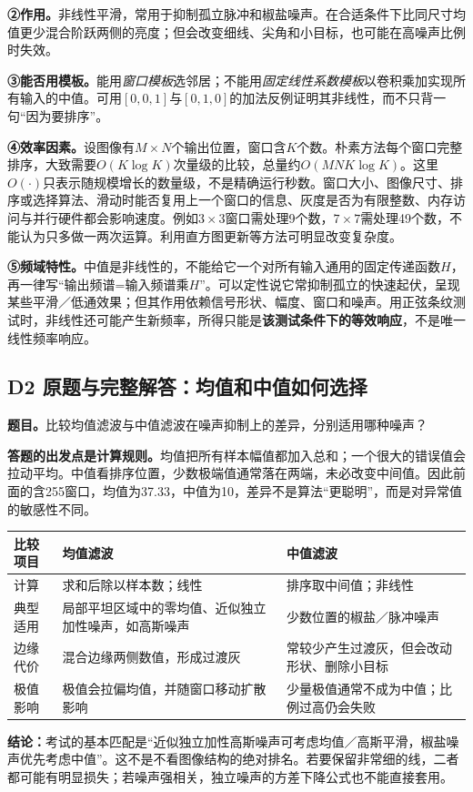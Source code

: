 \textbf{②作用。}非线性平滑，常用于抑制孤立脉冲和椒盐噪声。在合适条件下比同尺寸均值更少混合阶跃两侧的亮度；但会改变细线、尖角和小目标，也可能在高噪声比例时失效。

\textbf{③能否用模板。}能用\emph{窗口模板}选邻居；不能用\emph{固定线性系数模板}以卷积乘加实现所有输入的中值。可用$[0,0,1]$与$[0,1,0]$的加法反例证明其非线性，而不只背一句“因为要排序”。

\textbf{④效率因素。}设图像有$M\times N$个输出位置，窗口含$K$个数。朴素方法每个窗口完整排序，大致需要$O(K\log K)$次量级的比较，总量约$O(MNK\log K)$。这里$O(\cdot)$只表示随规模增长的数量级，不是精确运行秒数。窗口大小、图像尺寸、排序或选择算法、滑动时能否复用上一个窗口的信息、灰度是否为有限整数、内存访问与并行硬件都会影响速度。例如$3\times3$窗口需处理9个数，$7\times7$需处理49个数，不能认为只多做一两次运算。利用直方图更新等方法可明显改变复杂度。

\textbf{⑤频域特性。}中值是非线性的，不能给它一个对所有输入通用的固定传递函数$H$，再一律写“输出频谱=输入频谱乘$H$”。可以定性说它常抑制孤立的快速起伏，呈现某些平滑／低通效果；但其作用依赖信号形状、幅度、窗口和噪声。用正弦条纹测试时，非线性还可能产生新频率，所得只能是\textbf{该测试条件下的等效响应}，不是唯一线性频率响应。

\subsection{D2 原题与完整解答：均值和中值如何选择}
\label{original:D2}
\textbf{题目。}比较均值滤波与中值滤波在噪声抑制上的差异，分别适用哪种噪声？

\textbf{答题的出发点是计算规则。}均值把所有样本幅值都加入总和；一个很大的错误值会拉动平均。中值看排序位置，少数极端值通常落在两端，未必改变中间值。因此前面的含255窗口，均值为37.33，中值为10，差异不是算法“更聪明”，而是对异常值的敏感性不同。
\begin{center}
\begin{tabularx}{\linewidth}{@{}p{.16\linewidth}XX@{}}
\toprule
比较项目 & 均值滤波 & 中值滤波\\
\midrule
计算 & 求和后除以样本数；线性 & 排序取中间值；非线性\\
典型适用 & 局部平坦区域中的零均值、近似独立加性噪声，如高斯噪声 & 少数位置的椒盐／脉冲噪声\\
边缘代价 & 混合边缘两侧数值，形成过渡灰 & 常较少产生过渡灰，但会改动形状、删除小目标\\
极值影响 & 极值会拉偏均值，并随窗口移动扩散影响 & 少量极值通常不成为中值；比例过高仍会失败\\
\bottomrule
\end{tabularx}
\end{center}
\textbf{结论：}考试的基本匹配是“近似独立加性高斯噪声可考虑均值／高斯平滑，椒盐噪声优先考虑中值”。这不是不看图像结构的绝对排名。若要保留非常细的线，二者都可能有明显损失；若噪声强相关，独立噪声的方差下降公式也不能直接套用。

